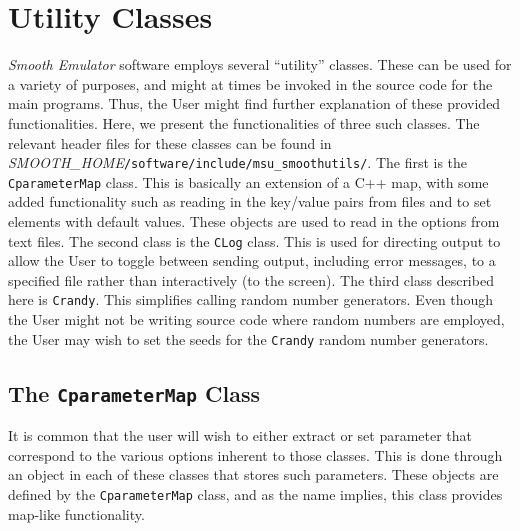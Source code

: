 \documentclass[UserManual.tex]{subfiles}
\begin{document}
\begin{sloppypar}

\section{Utility Classes}
{\it Smooth Emulator} software employs several ``utility'' classes. These can be used for a variety of purposes, and might at times be invoked in the source code for the main programs. Thus, the User might find further explanation of these provided functionalities. Here, we present the functionalities of three such classes. The relevant header files for these classes can be found in \textit{SMOOTH\_HOME}{\tt /software/include/msu\_smoothutils/}. The first is the {\tt CparameterMap} class. This is basically an extension of a C++ map, with some added functionality such as reading in the key/value pairs from files and to set elements with default values. These objects are used to read in the options from text files. The second class is the {\tt CLog} class. This is used for directing output to allow the User to toggle between sending output, including error messages, to a specified file rather than interactively (to the screen). The third class described here is {\tt Crandy}. This simplifies calling random number generators. Even though the User might not be writing source code where random numbers are employed, the User may wish to set the seeds for the {\tt Crandy} random number generators. 

\subsection{The {\tt CparameterMap} Class}\label{subsec:parameterMap}

It is common that the user will wish to either extract or set parameter that correspond to the various options inherent to those classes. This is done through an object in each of these classes that stores such parameters. These objects are defined by the {\tt CparameterMap} class, and as the name implies, this class provides map-like functionality. 


\end{sloppypar}
\end{document}
